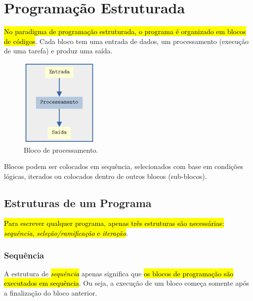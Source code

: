 

\chapter{Programação Estruturada}\label{cap_progest}

\hl{No paradigma de programação estruturada, o programa é organizado em blocos de códigos}. Cada bloco tem uma entrada de dados, um processamento (execução de uma tarefa) e produz uma saída.

\begin{figure}[H]
  \centering
  \includegraphics[width=1.5in]{./cap_progest/dados/fig_fg_bloco/fig.png}
  \caption{Bloco de processamento.}
  \label{cap_progest:fig:fg_bloco}
\end{figure}

Blocos podem ser colocados em sequência, selecionados com base em condições lógicas, iterados ou colocados dentro de outros blocos (sub-blocos).

\section{Estruturas de um Programa}\label{cap_progest_sec_est}

\hl{Para escrever qualquer programa, apenas três estruturas são necessárias: \emph{sequência}, \emph{seleção/ramificação} e \emph{iteração}}.

\subsection{Sequência}

A estrutura de \hl{\emph{sequência}} apenas significa que \hl{os blocos de programação são executados em sequência}. Ou seja, a execução de um bloco começa somente após a finalização do bloco anterior.

